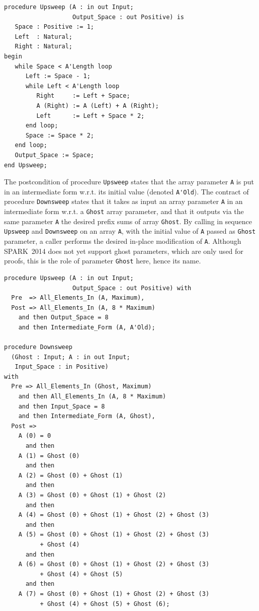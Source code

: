 \documentclass[sttt,final]{svjour}
\newcommand{\newspark}{SPARK~2014\xspace}
\newcommand{\wrt}{w.r.t.\xspace}
\begin{document}
\begin{lstlisting}
procedure Upsweep (A : in out Input;
                   Output_Space : out Positive) is
   Space : Positive := 1;
   Left  : Natural;
   Right : Natural;
begin
   while Space < A'Length loop
      Left := Space - 1;
      while Left < A'Length loop
         Right     := Left + Space;
         A (Right) := A (Left) + A (Right);
         Left      := Left + Space * 2;
      end loop;
      Space := Space * 2;
   end loop;
   Output_Space := Space;
end Upsweep;
\end{lstlisting}

The postcondition of procedure \verb|Upsweep| states that the array
parameter \verb|A| is put in an intermediate form \wrt its initial
value (denoted \verb|A'Old|). The contract of procedure
\verb|Downsweep| states that it takes as input an array parameter
\verb|A| in an intermediate form \wrt a \verb|Ghost| array parameter,
and that it outputs via the same parameter \verb|A| the desired prefix
sums of array \verb|Ghost|. By calling in sequence \verb|Upsweep| and
\verb|Downsweep| on an array \verb|A|, with the initial value of
\verb|A| passed as \verb|Ghost| parameter, a caller performs the
desired in-place modification of \verb|A|. Although \newspark does not
yet support ghost parameters, which are only used for proofs, this is
the role of parameter \verb|Ghost| here, hence its name.

\begin{lstlisting}
procedure Upsweep (A : in out Input;
                   Output_Space : out Positive) with
  Pre  => All_Elements_In (A, Maximum),
  Post => All_Elements_In (A, 8 * Maximum)
    and then Output_Space = 8
    and then Intermediate_Form (A, A'Old);

procedure Downsweep
  (Ghost : Input; A : in out Input;
   Input_Space : in Positive)
with
  Pre => All_Elements_In (Ghost, Maximum)
    and then All_Elements_In (A, 8 * Maximum)
    and then Input_Space = 8
    and then Intermediate_Form (A, Ghost),
  Post =>
    A (0) = 0
      and then
    A (1) = Ghost (0)
      and then
    A (2) = Ghost (0) + Ghost (1)
      and then
    A (3) = Ghost (0) + Ghost (1) + Ghost (2)
      and then
    A (4) = Ghost (0) + Ghost (1) + Ghost (2) + Ghost (3)
      and then
    A (5) = Ghost (0) + Ghost (1) + Ghost (2) + Ghost (3)
          + Ghost (4)
      and then
    A (6) = Ghost (0) + Ghost (1) + Ghost (2) + Ghost (3)
          + Ghost (4) + Ghost (5)
      and then
    A (7) = Ghost (0) + Ghost (1) + Ghost (2) + Ghost (3)
          + Ghost (4) + Ghost (5) + Ghost (6);
\end{lstlisting}
\end{document}
